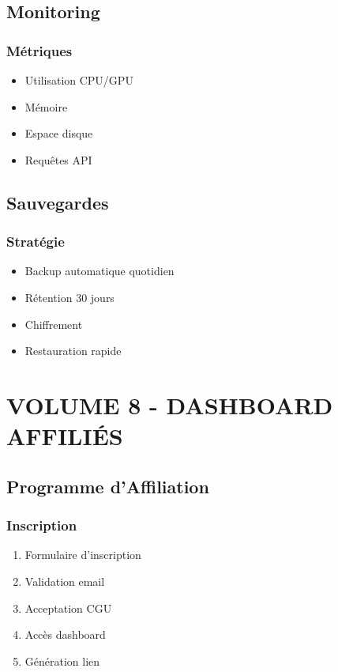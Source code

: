 \documentclass[12pt,a4paper,oneside]{book}
\begin{document}
\chapter{Monitoring}

\section{Métriques}
\begin{itemize}
\item Utilisation CPU/GPU
\item Mémoire
\item Espace disque
\item Requêtes API
\end{itemize}

\chapter{Sauvegardes}

\section{Stratégie}
\begin{itemize}
\item Backup automatique quotidien
\item Rétention 30 jours
\item Chiffrement
\item Restauration rapide
\end{itemize}

\part{VOLUME 8 - DASHBOARD AFFILIÉS}

\chapter{Programme d'Affiliation}

\section{Inscription}
\begin{enumerate}
\item Formulaire d'inscription
\item Validation email
\item Acceptation CGU
\item Accès dashboard
\item Génération lien
\end{enumerate}
\end{document}
